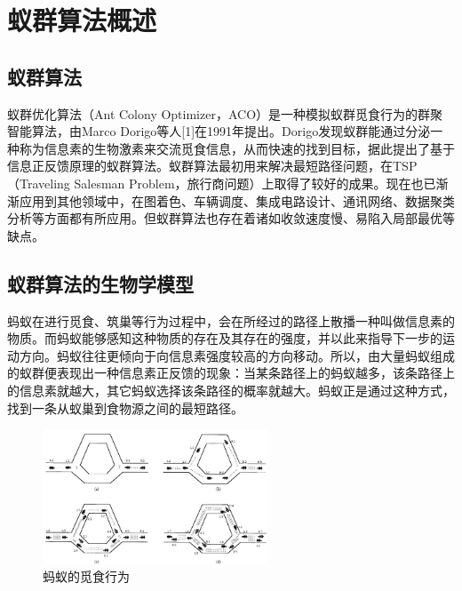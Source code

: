 \documentclass[a4paper,12pt]{report}
\begin{document}

\tableofcontents %




\chapter{蚁群算法概述}
\setcounter{page}{1}


\pagestyle{fancy}

\begin{spacing}{1.5}
\songti{}

\section{蚁群算法}
	蚁群优化算法（Ant Colony Optimizer，ACO）是一种模拟蚁群觅食行为的群聚智能算法，由Marco Dorigo等人[1]在1991年提出。Dorigo发现蚁群能通过分泌一种称为信息素的生物激素来交流觅食信息，从而快速的找到目标，据此提出了基于信息正反馈原理的蚁群算法。蚁群算法最初用来解决最短路径问题，在TSP（Traveling Salesman Problem，旅行商问题）上取得了较好的成果。现在也已渐渐应用到其他领域中，在图着色、车辆调度、集成电路设计、通讯网络、数据聚类分析等方面都有所应用。但蚁群算法也存在着诸如收敛速度慢、易陷入局部最优等缺点。



\section{蚁群算法的生物学模型}
	蚂蚁在进行觅食、筑巢等行为过程中，会在所经过的路径上散播一种叫做信息素的物质。而蚂蚁能够感知这种物质的存在及其存在的强度，并以此来指导下一步的运动方向。蚂蚁往往更倾向于向信息素强度较高的方向移动。所以，由大量蚂蚁组成的蚁群便表现出一种信息素正反馈的现象：当某条路径上的蚂蚁越多，该条路径上的信息素就越大，其它蚂蚁选择该条路径的概率就越大。蚂蚁正是通过这种方式，找到一条从蚁巢到食物源之间的最短路径。 
	
\begin{figure}[htbp]
		\centering
		\includegraphics[width=0.6\textwidth]{pic/ant1.png}
		\caption{蚂蚁的觅食行为}
		\label{fig:pt1}
\end{figure}


\end{spacing}
\end{document}
